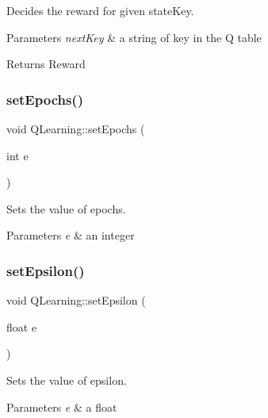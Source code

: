 Decides the reward for given state\+Key. 


\begin{DoxyParams}{Parameters}
{\em next\+Key} & a string of key in the Q table \\
\hline
\end{DoxyParams}
\begin{DoxyReturn}{Returns}
Reward 
\end{DoxyReturn}
\mbox{\label{classQLearning_a6946b885339af03e3c36b5e8e57ce617}} 
\subsubsection{\texorpdfstring{set\+Epochs()}{setEpochs()}}
{\footnotesize\ttfamily void Q\+Learning\+::set\+Epochs (\begin{DoxyParamCaption}\item[{int}]{e }\end{DoxyParamCaption})}



Sets the value of epochs. 


\begin{DoxyParams}{Parameters}
{\em e} & an integer \\
\hline
\end{DoxyParams}
\mbox{\label{classQLearning_a818c5eab3884a6e8be30d32c5d5305f5}} 
\subsubsection{\texorpdfstring{set\+Epsilon()}{setEpsilon()}}
{\footnotesize\ttfamily void Q\+Learning\+::set\+Epsilon (\begin{DoxyParamCaption}\item[{float}]{e }\end{DoxyParamCaption})}



Sets the value of epsilon. 


\begin{DoxyParams}{Parameters}
{\em e} & a float \\
\hline
\end{DoxyParams}
\mbox{\label{classQLearning_a2f0b606448c0645379158cd5d1077a14}} 
